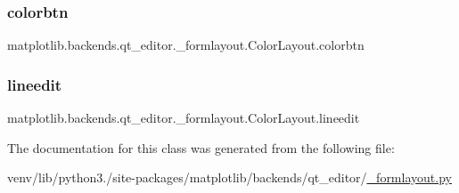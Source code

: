 \subsubsection{\texorpdfstring{colorbtn}{colorbtn}}
{\footnotesize\ttfamily matplotlib.\+backends.\+qt\+\_\+editor.\+\_\+formlayout.\+Color\+Layout.\+colorbtn}

\mbox{\label{classmatplotlib_1_1backends_1_1qt__editor_1_1__formlayout_1_1ColorLayout_aaffb5a95e1bc2a7fe6db9d3d44b418bf}} 
\subsubsection{\texorpdfstring{lineedit}{lineedit}}
{\footnotesize\ttfamily matplotlib.\+backends.\+qt\+\_\+editor.\+\_\+formlayout.\+Color\+Layout.\+lineedit}



The documentation for this class was generated from the following file\+:\begin{DoxyCompactItemize}
\item 
venv/lib/python3./site-\/packages/matplotlib/backends/qt\+\_\+editor/\hyperlink{__formlayout_8py}{\+\_\+formlayout.\+py}\end{DoxyCompactItemize}
